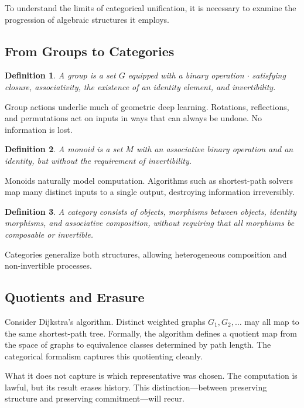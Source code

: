 \documentclass[11pt]{article}
\newtheorem{definition}{Definition}
\begin{document}
To understand the limits of categorical unification, it is necessary to examine
the progression of algebraic structures it employs.

\subsection{From Groups to Categories}

\begin{definition}
A \emph{group} is a set $G$ equipped with a binary operation $\cdot$ satisfying
closure, associativity, the existence of an identity element, and invertibility.
\end{definition}

Group actions underlie much of geometric deep learning. Rotations, reflections,
and permutations act on inputs in ways that can always be undone. No information
is lost.

\begin{definition}
A \emph{monoid} is a set $M$ with an associative binary operation and an identity,
but without the requirement of invertibility.
\end{definition}

Monoids naturally model computation. Algorithms such as shortest-path solvers map
many distinct inputs to a single output, destroying information irreversibly.

\begin{definition}
A \emph{category} consists of objects, morphisms between objects, identity
morphisms, and associative composition, without requiring that all morphisms be
composable or invertible.
\end{definition}

Categories generalize both structures, allowing heterogeneous composition and
non-invertible processes.

\subsection{Quotients and Erasure}

Consider Dijkstra’s algorithm. Distinct weighted graphs $G_1, G_2, \dots$ may all
map to the same shortest-path tree. Formally, the algorithm defines a quotient
map from the space of graphs to equivalence classes determined by path length.
The categorical formalism captures this quotienting cleanly.

What it does not capture is which representative was chosen. The computation is
lawful, but its result erases history. This distinction—between preserving
structure and preserving commitment—will recur.
\end{document}
